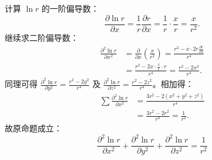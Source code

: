 \begin{myproof}
    计算 $\ln r$ 的一阶偏导数：
    \begin{equation}
        \frac{\partial \ln r}{\partial x} = \frac{1}{r} \frac{\partial r}{\partial x} = \frac{1}{r} \cdot \frac{x}{r} = \frac{x}{r^2}.
    \end{equation}
    继续求二阶偏导数：
    \begin{equation}
        \begin{aligned}
            \frac{\partial^2 \ln r}{\partial x^2} & = \frac{\partial}{\partial x} \left( \frac{x}{r^2} \right) = \frac{r^2 - x \cdot 2r \frac{\partial r}{\partial x}}{r^4} \\
                                                  & = \frac{r^2 - 2x \cdot \frac{x}{r} \cdot r}{r^4} = \frac{r^2 - 2x^2}{r^4}.
        \end{aligned}
    \end{equation}
    同理可得 $\frac{\partial^2 \ln r}{\partial y^2} = \frac{r^2 - 2y^2}{r^4}$ 及 $\frac{\partial^2 \ln r}{\partial z^2} = \frac{r^2 - 2z^2}{r^4}$。相加得：
    \begin{equation}
        \begin{aligned}
            \sum \frac{\partial^2 \ln r}{\partial x^2} & = \frac{3r^2 - 2(x^2 + y^2 + z^2)}{r^4}    \\
                                                       & = \frac{3r^2 - 2r^2}{r^4} = \frac{1}{r^2}.
        \end{aligned}
    \end{equation}
    故原命题成立：
    \begin{equation}
        \boxed{\frac{\partial^2 \ln r}{\partial x^2} + \frac{\partial^2 \ln r}{\partial y^2} + \frac{\partial^2 \ln r}{\partial z^2} = \frac{1}{r^2}}
    \end{equation}



\end{myproof}

